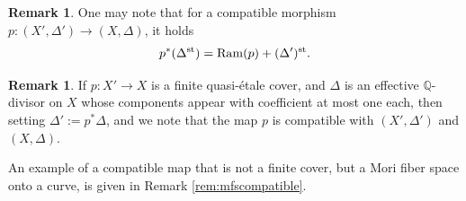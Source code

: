 \documentclass{amsart}
\theoremstyle{definition}
\newtheorem{remark}[theorem]{Remark}
\theoremstyle{remark}
\numberwithin{equation}{section}
\begin{document}
\begin{remark}
    One may note that for a compatible morphism $p:(X',\Delta')\to (X,\Delta)$, it holds $$p^{\ast}(\Delta^{\rm st})={\rm Ram}(p)+(\Delta')^{\rm st}.$$
\end{remark}


\begin{remark}
   If $p:X'\to X$ is a finite quasi-\'etale cover, and $\Delta$ is an effective $\mathbb{Q}$-divisor on $X$ whose components appear with coefficient at most one each, then setting $\Delta':=p^*\Delta$, and we note that the map $p$ is compatible with $(X',\Delta')$ and $(X,\Delta)$.
\end{remark}

An example of a compatible map that is not a finite cover, but a Mori fiber space onto a curve, is given in Remark \ref{rem:mfscompatible}.
\end{document}
